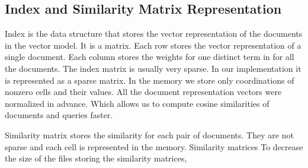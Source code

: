 \subsection{Index and Similarity Matrix Representation}
\label{sec:index_and_similarity_matrix_representation}

Index is the data structure that stores the vector representation of the documents in the vector model. It is a matrix. Each row stores the vector representation of a single document. Each column stores the weights for one distinct term in for all the documents. The index matrix is usually very sparse. In our implementation it is represented as a sparse matrix. In the memory we store only coordinations of nonzero cells and their values. All the document representation vectors were normalized in advance. Which allows us to compute cosine similarities of documents and queries faster.

Similarity matrix stores the similarity for each pair of documents. They are not sparse and each cell is represented in the memory. Similarity matrices To decrease the size of the files storing the similarity matrices, 
